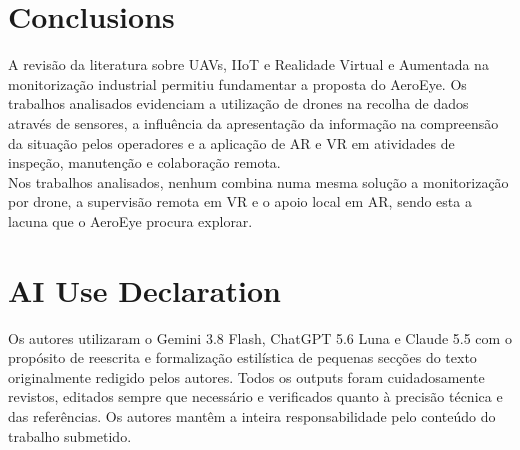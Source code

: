 \documentclass[conference,a4paper]{IEEEtran}
\begin{document}
\section{Conclusions}
A revisão da literatura sobre UAVs, IIoT e Realidade Virtual e Aumentada na monitorização industrial permitiu fundamentar a proposta do AeroEye. Os trabalhos analisados evidenciam a utilização de drones na recolha de dados através de sensores, a influência da apresentação da informação na compreensão da situação pelos operadores e a aplicação de AR e VR em atividades de inspeção, manutenção e colaboração remota. \\
Nos trabalhos analisados, nenhum combina numa mesma solução a monitorização por drone, a supervisão remota em VR e o apoio local em AR, sendo esta a lacuna que o AeroEye procura explorar.\\ 

\section*{AI Use Declaration}
Os autores utilizaram o Gemini 3.8 Flash, ChatGPT 5.6 Luna e Claude 5.5 com o propósito de reescrita e formalização estilística de pequenas secções do texto originalmente redigido pelos autores. Todos os outputs foram cuidadosamente revistos, editados sempre que necessário e verificados quanto à precisão técnica e das referências. Os autores mantêm a inteira responsabilidade pelo conteúdo do trabalho submetido.\\



\end{document}

